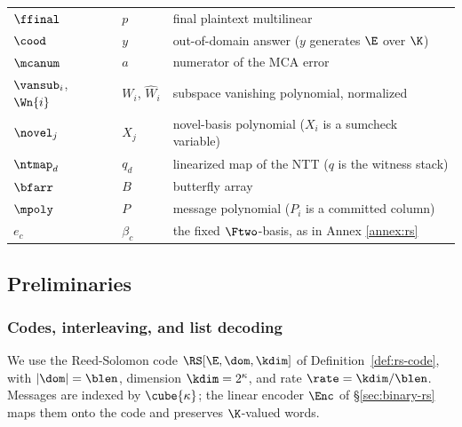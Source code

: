 \begin{center}
\begin{tabular}{@{}lll@{}}
$\ffinal$      & $p$          & final plaintext multilinear\\
$\cood$        & $y$          & out-of-domain answer ($y$ generates $\E$ over $\K$)\\
$\mcanum$      & $a$          & numerator of the MCA error\\
$\vansub_i$, $\Wn{i}$ & $W_i$, $\widehat W_i$ & subspace vanishing polynomial, normalized\\
$\novel_j$     & $X_j$        & novel-basis polynomial ($X_i$ is a sumcheck variable)\\
$\ntmap_d$     & $q_d$        & linearized map of the NTT ($q$ is the witness stack)\\
$\bfarr$       & $B$          & butterfly array\\
$\mpoly$       & $P$          & message polynomial ($P_i$ is a committed column)\\
$e_c$          & $\beta_c$    & the fixed $\Ftwo$-basis, as in Annex \ref{annex:rs}\\
\hline
\end{tabular}
\end{center}

\subsection{Preliminaries}\label{sec:prelims}

\subsubsection{Codes, interleaving, and list decoding}\label{sec:codes}

We use the Reed-Solomon code $\RS[\E,\dom,\kdim]$ of Definition~\ref{def:rs-code}, with $|\dom|=\blen$, dimension $\kdim=2^\kappa$, and rate $\rate=\kdim/\blen$. Messages are indexed by $\cube{\kappa}$; the linear encoder $\Enc$ of \S\ref{sec:binary-rs} maps them onto the code and preserves $\K$-valued words.

